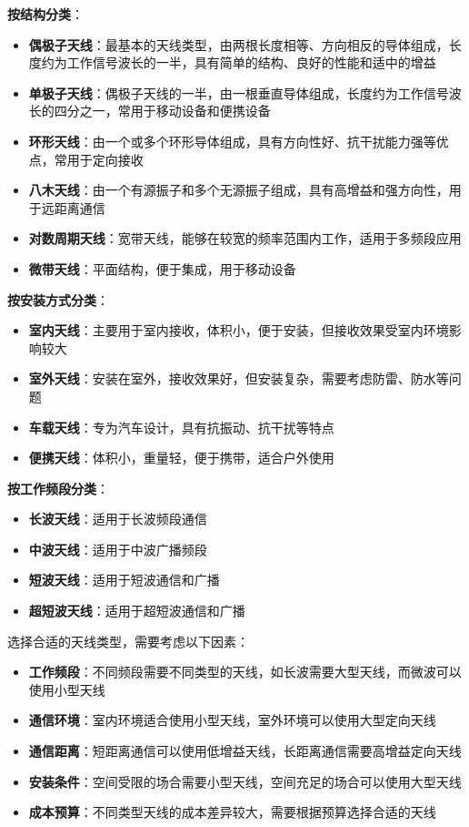 \documentclass[12pt,UTF8]{ctexbook}
\begin{document}
\textbf{按结构分类}：
\begin{itemize}[leftmargin=3.5em]
    \item \textbf{偶极子天线}：最基本的天线类型，由两根长度相等、方向相反的导体组成，长度约为工作信号波长的一半，具有简单的结构、良好的性能和适中的增益
    \item \textbf{单极子天线}：偶极子天线的一半，由一根垂直导体组成，长度约为工作信号波长的四分之一，常用于移动设备和便携设备
    \item \textbf{环形天线}：由一个或多个环形导体组成，具有方向性好、抗干扰能力强等优点，常用于定向接收
    \item \textbf{八木天线}：由一个有源振子和多个无源振子组成，具有高增益和强方向性，用于远距离通信
    \item \textbf{对数周期天线}：宽带天线，能够在较宽的频率范围内工作，适用于多频段应用
    \item \textbf{微带天线}：平面结构，便于集成，用于移动设备
\end{itemize}

\textbf{按安装方式分类}：
\begin{itemize}[leftmargin=3.5em]
    \item \textbf{室内天线}：主要用于室内接收，体积小，便于安装，但接收效果受室内环境影响较大
    \item \textbf{室外天线}：安装在室外，接收效果好，但安装复杂，需要考虑防雷、防水等问题
    \item \textbf{车载天线}：专为汽车设计，具有抗振动、抗干扰等特点
    \item \textbf{便携天线}：体积小，重量轻，便于携带，适合户外使用
\end{itemize}

\textbf{按工作频段分类}：
\begin{itemize}[leftmargin=3.5em]
    \item \textbf{长波天线}：适用于长波频段通信
    \item \textbf{中波天线}：适用于中波广播频段
    \item \textbf{短波天线}：适用于短波通信和广播
    \item \textbf{超短波天线}：适用于超短波通信和广播
\end{itemize}

选择合适的天线类型，需要考虑以下因素：

\begin{itemize}[leftmargin=3.5em]
    \item \textbf{工作频段}：不同频段需要不同类型的天线，如长波需要大型天线，而微波可以使用小型天线
    \item \textbf{通信环境}：室内环境适合使用小型天线，室外环境可以使用大型定向天线
    \item \textbf{通信距离}：短距离通信可以使用低增益天线，长距离通信需要高增益定向天线
    \item \textbf{安装条件}：空间受限的场合需要小型天线，空间充足的场合可以使用大型天线
    \item \textbf{成本预算}：不同类型天线的成本差异较大，需要根据预算选择合适的天线
\end{itemize}
\end{document}
